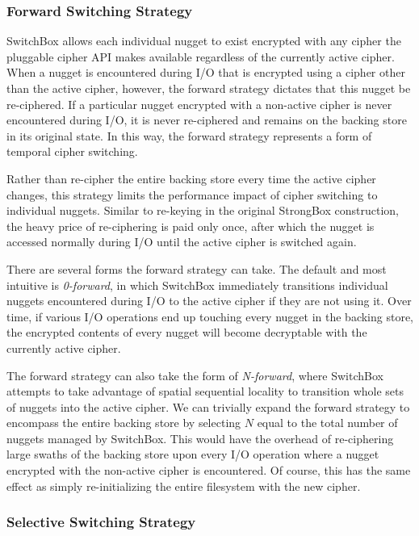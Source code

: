 \subsubsection{Forward Switching Strategy}

SwitchBox allows each individual nugget to exist encrypted with any cipher the
pluggable cipher API makes available regardless of the currently active cipher.
When a nugget is encountered during I/O that is encrypted using a cipher other
than the active cipher, however, the forward strategy dictates that this nugget
be re-ciphered. If a particular nugget encrypted with a non-active cipher is
never encountered during I/O, it is never re-ciphered and remains on the backing
store in its original state. In this way, the forward strategy represents a form
of temporal cipher switching.

Rather than re-cipher the entire backing store every time the active cipher
changes, this strategy limits the performance impact of cipher switching to
individual nuggets. Similar to re-keying in the original StrongBox construction,
the heavy price of re-ciphering is paid only once, after which the nugget is
accessed normally during I/O until the active cipher is switched again.

There are several forms the forward strategy can take. The default and most
intuitive is \emph{0-forward}, in which SwitchBox immediately transitions
individual nuggets encountered during I/O to the active cipher if they are not
using it. Over time, if various I/O operations end up touching every nugget in
the backing store, the encrypted contents of every nugget will become
decryptable with the currently active cipher.

The forward strategy can also take the form of \emph{N-forward}, where SwitchBox
attempts to take advantage of spatial sequential locality to transition whole
sets of nuggets into the active cipher. We can trivially expand the forward
strategy to encompass the entire backing store by selecting $N$ equal to the
total number of nuggets managed by SwitchBox. This would have the overhead of
re-ciphering large swaths of the backing store upon every I/O operation where a
nugget encrypted with the non-active cipher is encountered. Of course, this has
the same effect as simply re-initializing the entire filesystem with the new
cipher.

\subsubsection{Selective Switching Strategy}

